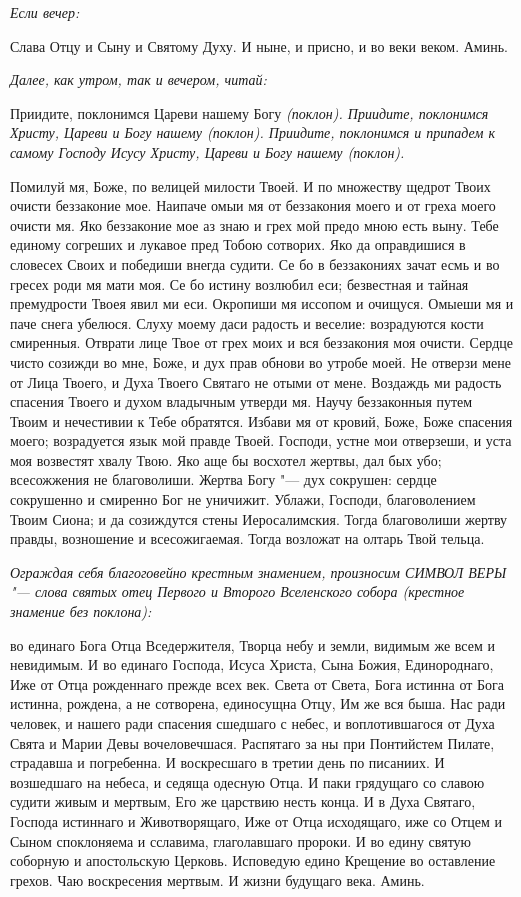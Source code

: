 \medskip\itshape Если вечер:\normalfont{}


Слава Отцу и Сыну и Святому Духу. И ныне, и присно, и во веки веком. Аминь.


\medskip\itshape Далее, как утром, так и вечером, читай:\normalfont{}


Приидите, поклонимся Цареви нашему Богу \itshape (поклон)\normalfont{}. Приидите, поклонимся Христу, Цареви и Богу нашему \itshape (поклон)\normalfont{}. Приидите, поклонимся и припадем к самому Господу Исусу Христу, Цареви и Богу нашему \itshape (поклон)\normalfont{}. 




Помилуй мя, Боже, по велицей милости Твоей. И по множеству щедрот Твоих очисти беззаконие мое. Наипаче омыи мя от беззакония моего и от греха моего очисти мя. Яко беззаконие мое аз знаю и грех мой предо мною есть выну. Тебе единому согреших и лукавое пред Тобою сотворих. Яко да оправдишися в словесех Своих и победиши внегда судити. Се бо в беззакониях зачат есмь и во гресех роди мя мати моя. Се бо истину возлюбил еси; безвестная и тайная премудрости Твоея явил ми еси. Окропиши мя иссопом и очищуся. Омыеши мя и паче снега убелюся. Слуху моему даси радость и веселие: возрадуются кости смиренныя. Отврати лице Твое от грех моих и вся беззакония моя очисти. Сердце чисто созижди во мне, Боже, и дух прав обнови во утробе моей. Не отверзи мене от Лица Твоего, и Духа Твоего Святаго не отыми от мене. Воздаждь ми радость спасения Твоего и духом владычным утверди мя. Научу беззаконныя путем Твоим и нечестивии к Тебе обратятся. Избави мя от кровий, Боже, Боже спасения моего; возрадуется язык мой правде Твоей. Господи, устне мои отверзеши, и уста моя возвестят хвалу Твою. Яко аще бы восхотел жертвы, дал бых убо; всесожжения не благоволиши. Жертва Богу "--- дух сокрушен: сердце сокрушенно и смиренно Бог не уничижит. Ублажи, Господи, благоволением Твоим Сиона; и да созиждутся стены Иеросалимския. Тогда благоволиши жертву правды, возношение и всесожигаемая. Тогда возложат на олтарь Твой тельца. 


\medskip\itshape Ограждая себя благоговейно крестным знамением, произносим СИМВОЛ ВЕРЫ "--- слова святых отец Первого и Второго Вселенского собора (крестное знамение без поклона): \normalfont{}


 во единаго Бога Отца Вседержителя, Творца небу и земли, видимым же всем и невидимым. И во единаго Господа, Исуса Христа, Сына Божия, Единороднаго, Иже от Отца рожденнаго прежде всех век. Света от Света, Бога истинна от Бога истинна, рождена, а не сотворена, единосущна Отцу, Им же вся быша. Нас ради человек, и нашего ради спасения сшедшаго с небес, и воплотившагося от Духа Свята и Марии Девы вочеловечшася. Распятаго за ны при Понтийстем Пилате, страдавша и погребенна. И воскресшаго в третии день по писаниих. И возшедшаго на небеса, и седяща одесную Отца. И паки грядущаго со славою судити живым и мертвым, Его же царствию несть конца. И в Духа Святаго, Господа истиннаго и Животворящаго, Иже от Отца исходящаго, иже со Отцем и Сыном споклоняема и сславима, глаголавшаго пророки. И во едину святую соборную и апостольскую Церковь. Исповедую едино Крещение во оставление грехов. Чаю воскресения мертвым. И жизни будущаго века. Аминь.


